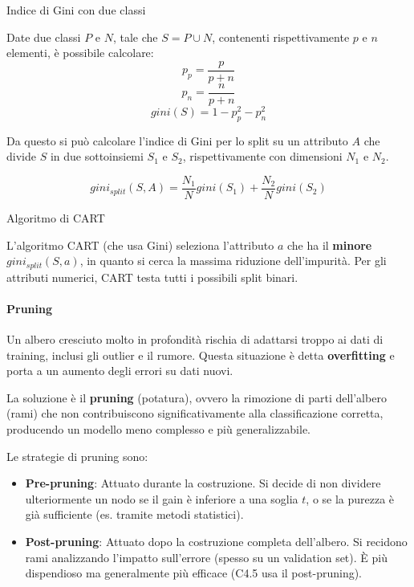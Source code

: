 \begin{esempio}{Indice di Gini con due classi}{}

Date due classi $P$ e $N$, tale che $S = P \cup N$, contenenti rispettivamente
$p$ e $n$ elementi, è possibile calcolare:
\[
p_p = \frac{p}{p + n}
\]
\[
p_n = \frac{n}{p + n}
\]
\[
gini(S) = 1 - p_{p}^{2} - p_{n}^{2}
\]

Da questo si può calcolare l'indice di Gini per lo split su un attributo
$A$ che divide $S$ in due sottoinsiemi $S_1$ e $S_2$, rispettivamente con
dimensioni $N_1$ e $N_2$.

\[
gini_{split}(S, A) = \frac{N_1}{N}gini(S_1) + \frac{N_2}{N}gini(S_2)
\]

\end{esempio}

\begin{nota}{Algoritmo di CART}{}

L'algoritmo CART (che usa Gini) seleziona l'attributo $a$ che ha il
\textbf{minore} $gini_{split}(S, a)$, in quanto si cerca la massima riduzione
dell'impurità. Per gli attributi numerici, CART testa tutti i possibili split
binari.

\end{nota}

\paragraph{Pruning}
Un albero cresciuto molto in profondità rischia di adattarsi troppo ai dati di
training, inclusi gli outlier e il rumore. Questa situazione è detta
\textbf{overfitting} e porta a un aumento degli errori su dati nuovi.

La soluzione è il \textbf{pruning} (potatura), ovvero la rimozione di parti
dell'albero (rami) che non contribuiscono significativamente alla
classificazione corretta, producendo un modello meno complesso e più
generalizzabile.

Le strategie di pruning sono:
\begin{itemize}
    \item \textbf{Pre-pruning}: Attuato durante la costruzione. Si decide di
    non dividere ulteriormente un nodo se il gain è inferiore a una soglia
    $t$, o se la purezza è già sufficiente (es. tramite metodi statistici).
    \item \textbf{Post-pruning}: Attuato dopo la costruzione completa
    dell'albero. Si recidono rami analizzando l'impatto sull'errore (spesso
    su un validation set). È più dispendioso ma generalmente più efficace
    (C4.5 usa il post-pruning).
\end{itemize}

